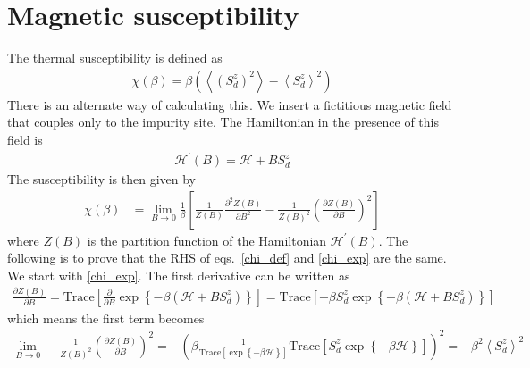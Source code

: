 \documentclass[twoside,11pt]{report}
\numberwithin{equation}{section}
\begin{document}
\section{Magnetic susceptibility}
The thermal susceptibility is defined as
\begin{equation}\begin{aligned}
	\label{chi_def}
	\chi(\beta) = \beta \left(\left<\left(S_d^z\right)^2\right> - \left<S_d^z\right>^2\right)
\end{aligned}\end{equation}
There is an alternate way of calculating this. We insert a fictitious magnetic field that couples only to the impurity site. The Hamiltonian in the presence of this field is
\begin{equation}\begin{aligned}
	\mathcal{H}^\prime(B) = \mathcal{H} + B S_d^z
\end{aligned}\end{equation}
The susceptibility is then given by
\begin{equation}\begin{aligned}
	\label{chi_exp}
	\chi(\beta) &= \lim_{B \to 0}\frac{1}{\beta}\left[\frac{1}{Z(B)} \frac{\partial^2{Z(B)}}{\partial{B^2}}-\frac{1}{Z(B)^2} \left(\frac{\partial{Z(B)}}{\partial{B}}\right)^2\right]
\end{aligned}\end{equation}
where \(Z(B)\) is the partition function of the Hamiltonian \(\mathcal{H}^\prime(B)\). The following is to prove that the RHS of eqs.~\ref{chi_def} and \ref{chi_exp} are the same. We start with \ref{chi_exp}. The first derivative can be written as
\begin{equation}\begin{aligned}
	\frac{\partial{Z(B)}}{\partial{B}} = \text{Trace}\left[\frac{\partial{}}{\partial{B}} \exp\left\{-\beta\left( \mathcal{H} + BS_d^z \right) \right\}\right] = \text{Trace}\left[-\beta S_d^z \exp\left\{-\beta\left( \mathcal{H} + BS_d^z \right) \right\}\right]
\end{aligned}\end{equation}
which means the first term becomes
\begin{equation}\begin{aligned}
	\lim_{B \to 0}-\frac{1}{Z(B)^2} \left(\frac{\partial{Z(B)}}{\partial{B}}\right)^2 = -\left(\beta \frac{1}{\text{Trace}\left[\exp\left\{-\beta\mathcal{H}\right\}\right]} \text{Trace}\left[S_d^z \exp\left\{-\beta\mathcal{H}\right\}\right]\right)^2 = -\beta^2 \left<S_d^z\right>^2
\end{aligned}\end{equation}
\end{document}
